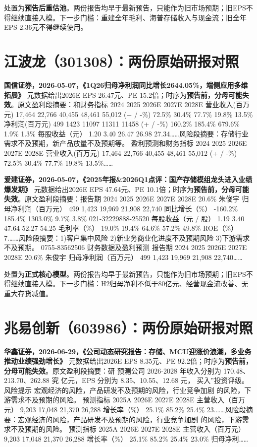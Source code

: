 \begin{keyinsight}[AStock处理]
处置为\textbf{预告后重估池}。两份报告均早于最新预告，只能作为旧市场预期；旧EPS不得继续直接入模。下一步门槛：重建全年毛利、海普存储收入与现金流；旧全年EPS 2.36元不得继续使用。
\end{keyinsight}

\section{江波龙（301308）：两份原始研报对照}

\textbf{国信证券，2026-05-07，《1Q26归母净利润同比增长2644.05\%，端侧应用多维拓展》}
元数据给出2026E EPS 26.47元、PE 15.2倍；时序为\textbf{预告前，分母可能失效}。原文盈利段摘要：和财务指标 2024 2025 2026E 2027E 2028E 营业收入(百万元) 17,464 22,766 40,455 48,461 55,012 (+ / -\%) 72.5\% 30.4\% 77.7\% 19.8\% 13.5\% 净利润(百万元) 499 1423 11097 11311 11458 (+ / -\%) 160.2\% 185.4\% 679.6\% 1.9\% 1.3\% 每股收益（元） 1.20 3.40 26.47 26.98 27.34……风险段摘要：存储行业需求不及预期，新产品放量不及预期等。 盈利预测和财务指标 2024 2025 2026E 2027E 2028E 营业收入(百万元) 17,464 22,766 40,455 48,461 55,012 (+ / -\%) 72.5\% 30.4\% 77.7\% 19.8\% 13.5\%……

\textbf{爱建证券，2026-05-07，《2025年报\&2026Q1点评：国产存储模组龙头进入业绩爆发期》}
元数据给出2026E EPS 47.64元、PE 10.1倍；时序为\textbf{预告前，分母可能失效}。原文盈利段摘要：报告期 2024 2025 2026E 2027E 2028E 20.6\% 朱俊宇 归母净利润（百万元） 499 1,423 19,969 21,908 22,740 同比增长（\%） -160.2\% 185.4\% 1303.0\% 9.7\% 3.8\% 021-32229888-25520 每股收益（元 / 股） 1.19 3.40 47.64 52.27 54.25 毛利率（\%） 19.0\% 19.4\% 64.6\% 57.2\% 49.8\% ROE（\%） 7.……风险段摘要：1)客户集中风险 2)新业务商业化进度不及预期风险 3)下游需求不及预期。 0755-83562506 财务数据及盈利预测 报告期 2024 2025 2026E 2027E 2028E 20.6\% 朱俊宇 归母净利润（百万元） 499 1,423 19,969 21,908 22,740……

\begin{keyinsight}[AStock处理]
处置为\textbf{正式核心模型}。两份报告均早于最新预告，只能作为旧市场预期；旧EPS不得继续直接入模。下一步门槛：H2归母净利不低于80亿元、经营现金流改善、无重大存货减值。
\end{keyinsight}

\section{兆易创新（603986）：两份原始研报对照}

\textbf{华鑫证券，2026-06-29，《公司动态研究报告：存储、MCU迎涨价浪潮，多业务推动业绩强劲增长》}
元数据给出2026E EPS 8.35元、PE 92.2倍；时序为\textbf{预告前，分母可能失效}。原文盈利段摘要：研 预测公司 2026-2028 年收入分别为 170.48、213.70、262.88 究 亿元，EPS 分别为 8.35、10.55、12.68 元， 买入”投资评级。 风险提示 宏观经济的风险，产品研发不及预期的风险，行业竞争加剧 的风险，下游需求不及预期的风险。 预测指标 2025A 2026E 2027E 2028E 主营收入（百万元） 9,203 17,048 21,370 26,288 增长率（\%） 25.1\% 85.2\% 25.4\% 23.……风险段摘要：宏观经济的风险，产品研发不及预期的风险，行业竞争加剧 的风险，下游需求不及预期的风险。 预测指标 2025A 2026E 2027E 2028E 主营收入（百万元） 9,203 17,048 21,370 26,288 增长率（\%） 25.1\% 85.2\% 25.4\% 23.0\% 归母净利……

